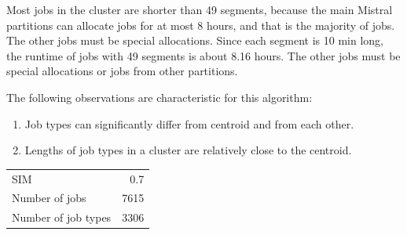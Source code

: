 \documentclass[]{llncs}
\begin{document}
Most jobs in the cluster are shorter than 49 segments, because the main Mistral partitions can allocate jobs for at most 8 hours, and that is the majority of jobs.
The other jobs must be special allocations.
Since each segment is 10 min long, the runtime of jobs with 49 segments is about 8.16 hours.
The other jobs must be special allocations or jobs from other partitions.

The following observations are characteristic for this algorithm:
\begin{enumerate}
 \item Job types can significantly differ from centroid and from each other.
 \item Lengths of job types in a cluster are relatively close to the centroid.
\end{enumerate}

\begingroup
  \centering
  \begin{tabular}{lr}
    SIM & 0.7 \\
    Number of jobs & 7615 \\
    Number of job types & 3306 \\
  \end{tabular}
  \label{tab:bin_all:stats}
\endgroup
\end{document}
